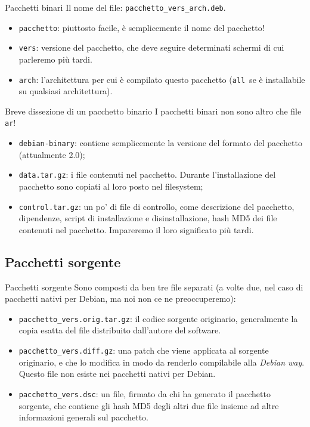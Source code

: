 \documentclass{beamer}
\begin{document}
\begin{frame}{Pacchetti binari}
	Il nome del file: {\tt pacchetto\_vers\_arch.deb}.
		\begin{itemize}
		\item {\tt pacchetto}: piuttosto facile, è semplicemente il nome del pacchetto!
		\pause
		\item {\tt vers}: versione del pacchetto, che deve seguire determinati schermi di cui parleremo più tardi.
		\pause
		\item {\tt arch}: l'architettura per cui è compilato questo pacchetto ({\tt all}~se è installabile su qualsiasi architettura).
		\end{itemize}
\end{frame}

\begin{frame}{Breve dissezione di un pacchetto binario}
	I pacchetti binari non sono altro che file {\tt ar}!
		\begin{itemize}
		\pause
		\item {\tt debian-binary}: contiene semplicemente la versione del formato del pacchetto (attualmente 2.0);
		\pause
		\item {\tt data.tar.gz}: i file contenuti nel pacchetto. Durante l'installazione del pacchetto sono copiati al loro posto nel filesystem;
		\pause
		\item {\tt control.tar.gz}: un po' di file di controllo, come descrizione del pacchetto, dipendenze, script di installazione e disinstallazione, hash MD5 dei file contenuti nel pacchetto. Impareremo il loro significato più tardi.
		\end{itemize}
\end{frame}

\subsection{Pacchetti sorgente}

\begin{frame}{Pacchetti sorgente}
	Sono composti da ben tre file separati (a volte due, nel caso di pacchetti nativi per Debian, ma noi non ce ne preoccuperemo):
		\begin{itemize}
		\item {\tt pacchetto\_vers.orig.tar.gz}: il codice sorgente originario, generalmente la copia esatta del file distribuito dall'autore del software.
		\pause
		\item {\tt pacchetto\_vers.diff.gz}: una patch che viene applicata al sorgente originario, e che lo modifica in modo da renderlo compilabile alla {\itshape Debian way}. Questo file non esiste nei pacchetti nativi per Debian.
		\pause
		\item {\tt pacchetto\_vers.dsc}: un file, firmato da chi ha generato il pacchetto sorgente, che contiene gli hash MD5 degli altri due file insieme ad altre informazioni generali sul pacchetto.
		\end{itemize}
\end{frame}
\end{document}
